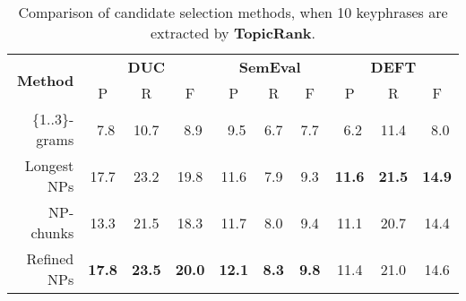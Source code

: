       \begin{table}
        \centering
        \begin{tabular}{rccccccccc}
          \toprule
          \multirow{2}{*}[-2pt]{\textbf{Method}} & \multicolumn{3}{c}{\textbf{DUC}} & \multicolumn{3}{c}{\textbf{SemEval}} & \multicolumn{3}{c}{\textbf{DEFT}}\\
          \cmidrule(r){2-4}\cmidrule(lr){5-7}\cmidrule(l){8-10}
          & P & R & F & P & R & F & P & R & F\\
          \midrule
          \{1..3\}-grams & $~~$7.8 & 10.7 & $~~$8.9 & $~~$9.5 & $~~$6.7 & $~~$7.7 & $~~$6.2 & 11.4 & $~~$8.0\\
          Longest NPs & 17.7 & 23.2 & 19.8 & 11.6 & $~~$7.9 & $~~$9.3 & \textbf{11.6} & \textbf{21.5} & \textbf{14.9}\\
          NP-chunks & 13.3 & 21.5 & 18.3 & 11.7 & $~~$8.0 & $~~$9.4 & 11.1 & 20.7 & 14.4\\
          Refined NPs & \textbf{17.8} & \textbf{23.5} & \textbf{20.0} & \textbf{12.1} & \textbf{$~~$8.3} & \textbf{$~~$9.8} & 11.4 & 21.0 & 14.6\\
          \bottomrule
        \end{tabular}
        \caption{Comparison of candidate selection methods, when 10 keyphrases
                 are extracted by \textbf{TopicRank}.
                 \label{tab:topicrank_results}}
      \end{table}
